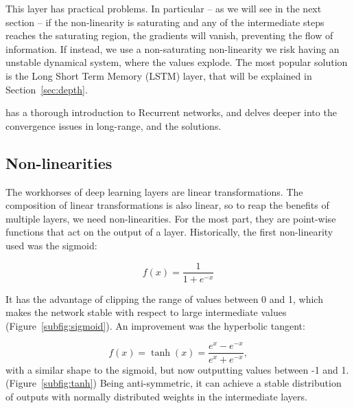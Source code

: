 This layer has practical problems. 
In particular -- as we will see in the next section -- if the non-linearity is saturating and any of the intermediate steps reaches the saturating region, the gradients will vanish, preventing the flow of information.
If instead, we use a non-saturating non-linearity we risk having an unstable dynamical system, where the values explode.
The most popular solution  is the Long Short Term Memory (LSTM) layer, that will be explained in Section~\ref{sec:depth}.


\citet{unreasonable_RNN} has a thorough introduction to Recurrent networks, and \citet{colah_rnn} delves deeper into the convergence issues in long-range, and the solutions.

\subsection{Non-linearities}
The workhorses of deep learning layers are linear transformations.
The composition of linear transformations is also linear, so to reap the benefits of multiple layers, we need non-linearities.
For the most part, they are point-wise functions that act on the output of a layer.
Historically, the first non-linearity used was the sigmoid:

\begin{equation*}
f(x) = \frac{1}{1 + e^{- x}}
\end{equation*}

It has the advantage of clipping the range of values between 0 and 1, which makes the network stable with respect to large intermediate values (Figure~\ref{subfig:sigmoid}).
An improvement was the hyperbolic tangent:

\begin{equation*}
f(x) = \tanh(x) = \frac{e^x - e^{-x}}{e^x + e^{-x}},
\end{equation*}
with a similar shape to the sigmoid, but now outputting values between -1 and 1. (Figure~\ref{subfig:tanh})
Being anti-symmetric, it can achieve a stable distribution of outputs with normally distributed weights in the intermediate layers.

